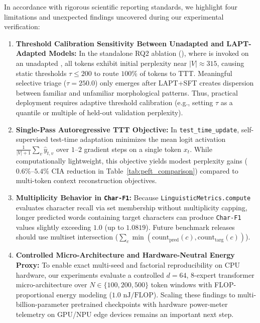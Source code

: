 \documentclass{interact}
\begin{document}
In accordance with rigorous scientific reporting standards, we highlight four limitations and unexpected findings uncovered during our experimental verification:
\begin{enumerate}
    \item \textbf{Threshold Calibration Sensitivity Between Unadapted and LAPT-Adapted Models:} In the standalone RQ2 ablation (), where  is invoked on an unadapted , all tokens exhibit initial perplexity near $|V| \approx 315$, causing static thresholds $\tau \le 200$ to route $100\%$ of tokens to TTT. Meaningful selective triage ($\tau = 250.0$) only emerges after LAPT+SFT creates dispersion between familiar and unfamiliar morphological patterns. Thus, practical deployment requires adaptive threshold calibration (e.g., setting $\tau$ as a quantile or multiple of held-out validation perplexity).
    \item \textbf{Single-Pass Autoregressive TTT Objective:} In \texttt{test\_time\_update}, self-supervised test-time adaptation minimizes the mean logit activation $\frac{1}{|V|+1}\sum_v \hat{y}_{t,v}$ over $1$--$2$ gradient steps on a single token $x_t$. While computationally lightweight, this objective yields modest perplexity gains ($0.6\%$--$5.4\%$ CIA reduction in Table~\ref{tab:peft_comparison}) compared to multi-token context reconstruction objectives.
    \item \textbf{Multiplicity Behavior in \texttt{Char-F1}:} Because \texttt{LinguisticMetrics.compute} evaluates character recall via set membership without multiplicity capping, longer predicted words containing target characters can produce \texttt{Char-F1} values slightly exceeding $1.0$ (up to $1.0819$). Future benchmark releases should use multiset intersection ($\sum_c \min(\text{count}_{\text{pred}}(c), \text{count}_{\text{targ}}(c))$).
    \item \textbf{Controlled Micro-Architecture and Hardware-Neutral Energy Proxy:} To enable exact multi-seed and factorial reproducibility on CPU hardware, our experiments evaluate a controlled $d=64$, $8$-expert transformer micro-architecture over $N \in \{100, 200, 500\}$ token windows with FLOP-proportional energy modeling ($1.0\text{ nJ/FLOP}$). Scaling these findings to multi-billion-parameter pretrained checkpoints with hardware power-meter telemetry on GPU/NPU edge devices remains an important next step.
\end{enumerate}
\end{document}

